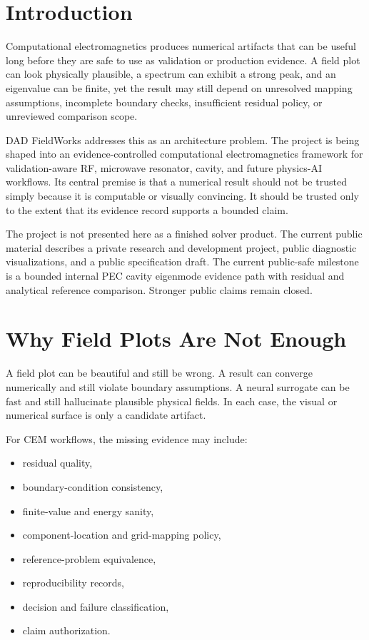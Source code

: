 \documentclass[11pt,a4paper]{article}
\begin{document}
\tableofcontents
\newpage

\section{Introduction}

Computational electromagnetics produces numerical artifacts that can be useful long before they are safe to use as validation or production evidence. A field plot can look physically plausible, a spectrum can exhibit a strong peak, and an eigenvalue can be finite, yet the result may still depend on unresolved mapping assumptions, incomplete boundary checks, insufficient residual policy, or unreviewed comparison scope.

DAD FieldWorks addresses this as an architecture problem. The project is being shaped into an evidence-controlled computational electromagnetics framework for validation-aware RF, microwave resonator, cavity, and future physics-AI workflows. Its central premise is that a numerical result should not be trusted simply because it is computable or visually convincing. It should be trusted only to the extent that its evidence record supports a bounded claim.

The project is not presented here as a finished solver product. The current public material describes a private research and development project, public diagnostic visualizations, and a public specification draft. The current public-safe milestone is a bounded internal PEC cavity eigenmode evidence path with residual and analytical reference comparison. Stronger public claims remain closed.

\section{Why Field Plots Are Not Enough}

A field plot can be beautiful and still be wrong. A result can converge numerically and still violate boundary assumptions. A neural surrogate can be fast and still hallucinate plausible physical fields. In each case, the visual or numerical surface is only a candidate artifact.

For CEM workflows, the missing evidence may include:

\begin{itemize}
  \item residual quality,
  \item boundary-condition consistency,
  \item finite-value and energy sanity,
  \item component-location and grid-mapping policy,
  \item reference-problem equivalence,
  \item reproducibility records,
  \item decision and failure classification,
  \item claim authorization.
\end{itemize}
\end{document}
